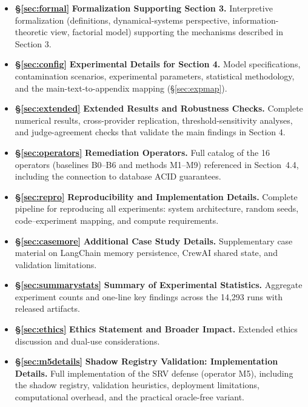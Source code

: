 \documentclass{article}
\theoremstyle{plain}
\theoremstyle{definition}
\begin{document}
\vspace{-0.5em}
\begin{itemize}\setlength{\itemsep}{0pt}
    \item \textbf{\S\ref{sec:formal}} \textbf{Formalization Supporting Section 3.} Interpretive formalization (definitions, dynamical-systems perspective, information-theoretic view, factorial model) supporting the mechanisms described in Section 3.
    \item \textbf{\S\ref{sec:config}} \textbf{Experimental Details for Section 4.} Model specifications, contamination scenarios, experimental parameters, statistical methodology, and the main-text-to-appendix mapping (\S\ref{sec:expmap}).
    \item \textbf{\S\ref{sec:extended}} \textbf{Extended Results and Robustness Checks.} Complete numerical results, cross-provider replication, threshold-sensitivity analyses, and judge-agreement checks that validate the main findings in Section 4.
    \item \textbf{\S\ref{sec:operators}} \textbf{Remediation Operators.} Full catalog of the 16 operators (baselines B0--B6 and methods M1--M9) referenced in Section~4.4, including the connection to database ACID guarantees.
    \item \textbf{\S\ref{sec:repro}} \textbf{Reproducibility and Implementation Details.} Complete pipeline for reproducing all experiments: system architecture, random seeds, code--experiment mapping, and compute requirements.
    \item \textbf{\S\ref{sec:casemore}} \textbf{Additional Case Study Details.} Supplementary case material on LangChain memory persistence, CrewAI shared state, and validation limitations.
    \item \textbf{\S\ref{sec:summarystats}} \textbf{Summary of Experimental Statistics.} Aggregate experiment counts and one-line key findings across the 14{,}293 runs with released artifacts.
    \item \textbf{\S\ref{sec:ethics}} \textbf{Ethics Statement and Broader Impact.} Extended ethics discussion and dual-use considerations.
    \item \textbf{\S\ref{sec:m5details}} \textbf{Shadow Registry Validation: Implementation Details.} Full implementation of the SRV defense (operator M5), including the shadow registry, validation heuristics, deployment limitations, computational overhead, and the practical oracle-free variant.
\end{itemize}
\end{document}
